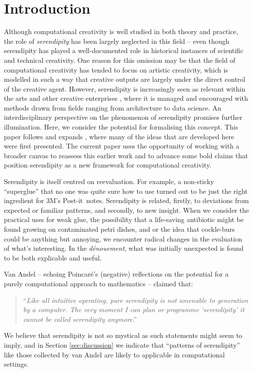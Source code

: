 \section{Introduction}

Although computational creativity is well studied in both theory and
practice, the role of \emph{serendipity} has been largely neglected
in this field -- even though serendipity has played a well-documented
role in historical instances of scientific and technical creativity.
One reason for this omission may be that the field of computational
creativity has tended to focus on artistic creativity, which is modelled in such a way that creative outputs are largely under the direct control of the creative agent.  However,  
serendipity is increasingly seen as relevant within the arts
\cite{mckay-serendipity} and other creative enterprises
\cite{kakko2009homo,engineering-serendipity}, where it is managed and
encouraged with methods drawn from fields ranging from architecture to data science.
%
An interdisciplinary perspective on the phenomenon of serendipity
promises further illumination.  Here, we consider the potential for
formalising this concept.  This paper follows and expands , where many of the ideas that are developed here were first presented.  The current paper uses the opportunity of working with a broader canvas to reassess this earlier work and to advance some bold claims that position serendipity as a new framework for computational creativity.

Serendipity is itself centred on reevaluation.  For example, a
non-sticky ``superglue'' that no one was quite sure how to use turned
out to be just the right ingredient for 3M's
Post-it\texttrademark\ notes.
%
Serendipity is related, firstly, to deviations from expected or
familiar patterns, and secondly, to new insight.
%
When we consider the practical uses for weak glue, the possibility
that a life-saving antibiotic might be found growing on contaminated
petri dishes, and or the idea that cockle-burs could be anything but
annoying, we encounter radical changes in the evaluation of what's
interesting.  In the \emph{d\'enouement}, what was initially
unexpected is found to be both explicable and useful.

Van Andel \citeyear{van1994anatomy} -- echoing Poincar\'e's
\citeyear{poincare1910creation} (negative) reflections on the potential
for a purely computational approach to mathematics -- claimed that:
\begin{quote}
``\emph{Like all intuitive operating, pure serendipity is not amenable
    to generation by a computer.  The very moment I can plan or
    programme `serendipity' it cannot be called serendipity
    anymore}.'' \cite{van1994anatomy}
\end{quote}
We believe that serendipity is not so mystical as such statements
might seem to imply, and in Section \ref{sec:discussion} we indicate
that ``patterns of serendipity'' like those collected by van Andel
are likely to applicable in computational settings.

